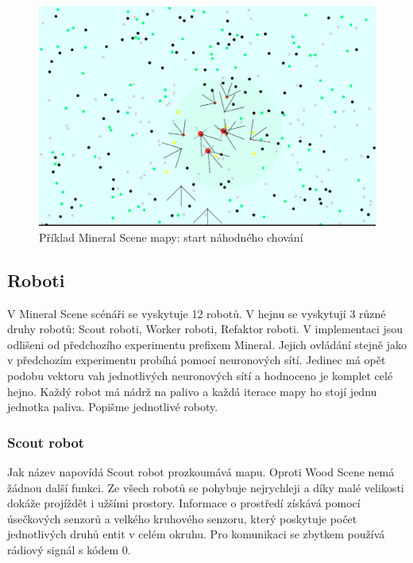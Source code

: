 \begin{figure}[p]\centering
	\includegraphics[width=\columnwidth]{../img/MineralMap/MineralRandom.png}
	\caption{Příklad Mineral Scene mapy: start náhodného chování}
	\label{obr04:MineralSceneRandomStart}
\end{figure}
\clearpage 
\subsection{Roboti}
V Mineral Scene scénáři se vyskytuje 12 robotů. V hejnu se vyskytují 3 různé druhy robotů: Scout roboti, Worker roboti, Refaktor roboti. V implementaci jsou odlišeni od předchozího experimentu prefixem Mineral. Jejich ovládání stejně jako v předchozím experimentu probíhá pomocí neuronových sítí. Jedinec má opět podobu vektoru vah jednotlivých neuronových sítí a hodnoceno je komplet celé hejno. Každý robot má nádrž na palivo a každá iterace mapy ho stojí jednu jednotka paliva. Popišme jednotlivé roboty.
\subsubsection{Scout robot}
Jak název napovídá Scout robot prozkoumává mapu. Oproti Wood Scene nemá žádnou další funkci. Ze všech robotů se pohybuje nejrychleji a díky malé velikosti dokáže projíždět i užšími prostory. Informace o prostředí získává pomocí úsečkových senzorů a velkého kruhového senzoru, který poskytuje počet jednotlivých druhů entit v celém okruhu. Pro komunikaci se zbytkem používá rádiový signál s kódem 0. 
\par  

